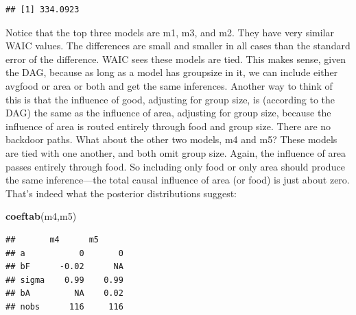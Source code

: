 \documentclass[
]{article}
\newenvironment{Shaded}{\begin{snugshade}}{\end{snugshade}}
\newcommand{\KeywordTok}[1]{\textcolor[rgb]{0.13,0.29,0.53}{\textbf{#1}}}
\newcommand{\NormalTok}[1]{#1}
\newcommand{\OperatorTok}[1]{\textcolor[rgb]{0.81,0.36,0.00}{\textbf{#1}}}
\begin{document}
\begin{Shaded}
\end{Shaded}

\begin{verbatim}
## [1] 334.0923
\end{verbatim}

Notice that the top three models are m1, m3, and m2. They have very
similar WAIC values. The differences are small and smaller in all cases
than the standard error of the difference. WAIC sees these models are
tied. This makes sense, given the DAG, because as long as a model has
groupsize in it, we can include either avgfood or area or both and get
the same inferences. Another way to think of this is that the influence
of good, adjusting for group size, is (according to the DAG) the same as
the influence of area, adjusting for group size, because the influence
of area is routed entirely through food and group size. There are no
backdoor paths. What about the other two models, m4 and m5? These models
are tied with one another, and both omit group size. Again, the
influence of area passes entirely through food. So including only food
or only area should produce the same inference---the total causal
influence of area (or food) is just about zero. That's indeed what the
posterior distributions suggest:

\begin{Shaded}
\begin{Highlighting}[]
\KeywordTok{coeftab}\NormalTok{(m4,m5)}
\end{Highlighting}
\end{Shaded}

\begin{verbatim}
##       m4      m5     
## a           0       0
## bF      -0.02      NA
## sigma    0.99    0.99
## bA         NA    0.02
## nobs      116     116
\end{verbatim}
\end{document}
